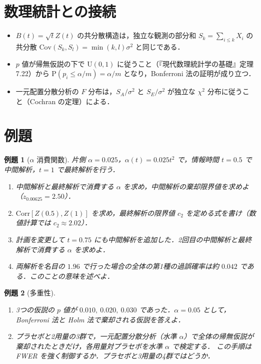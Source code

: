 \documentclass[a4paper,11pt,openany]{ltjsbook}
\newtheorem{reidai}{例題}[chapter]
\newcommand{\Cov}{\mathrm{Cov}}
\newcommand{\Corr}{\mathrm{Corr}}
\newcommand{\Prob}{\mathrm{P}}
\newcommand{\Unif}{\mathrm{U}}
\begin{document}
\section{数理統計との接続}\label{sec:14-link}
\begin{linkbox}
\begin{itemize}
\item $B(t)=\sqrt tZ(t)$ の共分散構造は，独立な観測の部分和 $S_k=\sum_{i\le k}X_i$ の共分散 $\Cov(S_k,S_l)=\min(k,l)\sigma^2$ と同じである．
\item $p$ 値が帰無仮説の下で $\Unif(0,1)$ に従うこと（『現代数理統計学の基礎』定理7.22）から $\Prob(p_i\le\alpha/m)=\alpha/m$ となり，Bonferroni 法の証明が成り立つ．
\item 一元配置分散分析の $F$ 分布は，$S_A/\sigma^2$ と $S_E/\sigma^2$ が独立な $\chi^2$ 分布に従うこと（Cochran の定理）による．
\end{itemize}
\end{linkbox}

\section{例題}\label{sec:14-ex}
\begin{reidai}[$\alpha$ 消費関数]\label{reidai:14-1}
片側 $\alpha=0.025$，$\alpha(t)=0.025t^2$ で，情報時間 $t=0.5$ で中間解析，$t=1$ で最終解析を行う．
\begin{enumerate}[label=(\arabic*)]
\item 中間解析と最終解析で消費する $\alpha$ を求め，中間解析の棄却限界値を求めよ（$z_{0.00625}=2.50$）．
\item $\Corr[Z(0.5),Z(1)]$ を求め，最終解析の限界値 $c_2$ を定める式を書け（数値計算では $c_2\approx2.02$）．
\item 計画を変更して $t=0.75$ にも中間解析を追加した．2回目の中間解析と最終解析で消費する $\alpha$ を求めよ．
\item 両解析を名目の $1.96$ で行った場合の全体の第1種の過誤確率は約 $0.042$ である．このことの意味を述べよ．
\end{enumerate}
\end{reidai}

\begin{reidai}[多重性]\label{reidai:14-2}
\begin{enumerate}[label=(\arabic*)]
\item 3つの仮説の $p$ 値が $0.010,\ 0.020,\ 0.030$ であった．$\alpha=0.05$ として，Bonferroni 法と Holm 法で棄却される仮説を答えよ．
\item プラセボと2用量の3群で，一元配置分散分析（水準 $\alpha$）で全体の帰無仮説が棄却されたときだけ，各用量対プラセボを水準 $\alpha$ で検定する．
      この手順は FWER を強く制御するか．プラセボと3用量の4群ではどうか．
\end{enumerate}
\end{reidai}
\end{document}

